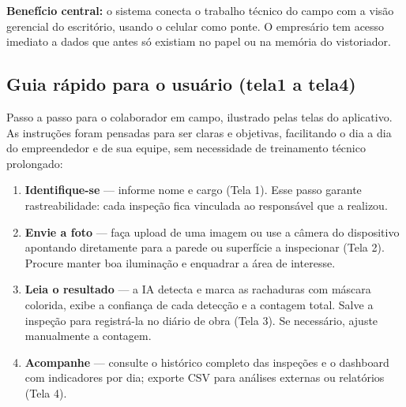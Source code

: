 \documentclass[11pt,a4paper]{article}
\begin{document}
\begin{infobox}
\textbf{Benefício central:} o sistema conecta o trabalho técnico do campo com a visão gerencial
do escritório, usando o celular como ponte. O empresário tem acesso imediato a dados que antes
só existiam no papel ou na memória do vistoriador.
\end{infobox}

\subsection{Guia rápido para o usuário (tela1 a tela4)}
Passo a passo para o colaborador em campo, ilustrado pelas telas do aplicativo. As instruções
foram pensadas para ser claras e objetivas, facilitando o dia a dia do empreendedor e de sua
equipe, sem necessidade de treinamento técnico prolongado:

\begin{enumerate}[leftmargin=1.6em]
  \item \textbf{Identifique-se} — informe nome e cargo (Tela 1). Esse passo garante
        rastreabilidade: cada inspeção fica vinculada ao responsável que a realizou.
  \item \textbf{Envie a foto} — faça upload de uma imagem ou use a câmera do dispositivo
        apontando diretamente para a parede ou superfície a inspecionar (Tela 2). Procure
        manter boa iluminação e enquadrar a área de interesse.
  \item \textbf{Leia o resultado} — a IA detecta e marca as rachaduras com máscara colorida,
        exibe a confiança de cada detecção e a contagem total. Salve a inspeção para registrá-la
        no diário de obra (Tela 3). Se necessário, ajuste manualmente a contagem.
  \item \textbf{Acompanhe} — consulte o histórico completo das inspeções e o dashboard com
        indicadores por dia; exporte CSV para análises externas ou relatórios (Tela 4).
\end{enumerate}
\end{document}
